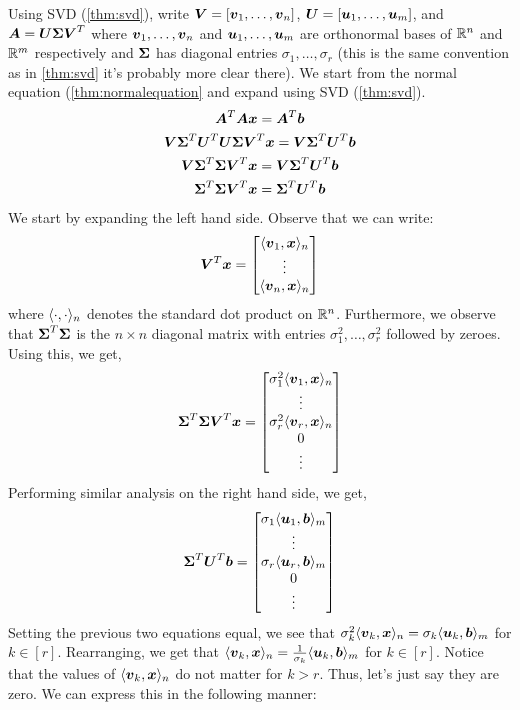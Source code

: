 Using SVD (\ref{thm:svd}), write $\boldsymbol{V}=[\boldsymbol{v}_1,\dots,\boldsymbol{v}_n]$, $\boldsymbol{U}=[\boldsymbol{u}_1,\dots, \boldsymbol{u}_m]$, and $\boldsymbol{A}=\boldsymbol{U}\boldsymbol{\Sigma}\boldsymbol{V}^T$ where $\boldsymbol{v}_1,\dots,\boldsymbol{v}_n$ and $\boldsymbol{u}_1,\dots,\boldsymbol{u}_m$ are orthonormal bases of $\mathbb{R}^n$ and $\mathbb{R}^m$ respectively and $\boldsymbol{\Sigma}$ has diagonal entries $\sigma_1,\dots,\sigma_r$ (this is the same convention as in \ref{thm:svd} it's probably more clear there). We start from the normal equation (\ref{thm:normalequation} and expand using SVD (\ref{thm:svd}).
\begin{gather*}
    \boldsymbol{A}^T\boldsymbol{A}\boldsymbol{x}=\boldsymbol{A}^T\boldsymbol{b}\\
    \boldsymbol{V}\boldsymbol{\Sigma}^T\boldsymbol{U}^T\boldsymbol{U}\boldsymbol{\Sigma}\boldsymbol{V}^T\boldsymbol{x}=\boldsymbol{V}\boldsymbol{\Sigma}^T\boldsymbol{U}^T\boldsymbol{b}\\
    \boldsymbol{V}\boldsymbol{\Sigma}^T\boldsymbol{\Sigma}\boldsymbol{V}^T\boldsymbol{x}=\boldsymbol{V}\boldsymbol{\Sigma}^T\boldsymbol{U}^T\boldsymbol{b}\\
    \boldsymbol{\Sigma}^T\boldsymbol{\Sigma}\boldsymbol{V}^T\boldsymbol{x}=\boldsymbol{\Sigma}^T\boldsymbol{U}^T\boldsymbol{b}
\end{gather*}
We start by expanding the left hand side. Observe that we can write:
\[
\boldsymbol{V}^T\boldsymbol{x}=\begin{bmatrix}
    \langle\boldsymbol{v}_1,\boldsymbol{x}\rangle_n\\
    \vdots\\
    \langle\boldsymbol{v}_n,\boldsymbol{x}\rangle_n
\end{bmatrix}
\]
where $\langle\cdot,\cdot\rangle_n$ denotes the standard dot product on $\mathbb{R}^n$. Furthermore, we observe that $\boldsymbol{\Sigma}^T\boldsymbol{\Sigma}$ is the $n\times n$ diagonal matrix with entries $\sigma_1^2,\dots,\sigma_r^2$ followed by zeroes. Using this, we get,
\[
\boldsymbol{\Sigma}^T\boldsymbol{\Sigma}\boldsymbol{V}^T\boldsymbol{x}=\begin{bmatrix}
    \sigma_1^2\langle\boldsymbol{v}_1,\boldsymbol{x}\rangle_n\\
    \vdots\\
    \sigma_r^2\langle\boldsymbol{v}_r,\boldsymbol{x}\rangle_n\\
    0 \\
    \vdots
\end{bmatrix}
\]
Performing similar analysis on the right hand side, we get,
\[
\boldsymbol{\Sigma}^T\boldsymbol{U}^T\boldsymbol{b}=\begin{bmatrix}
    \sigma_1\langle\boldsymbol{u}_1,\boldsymbol{b}\rangle_m\\
    \vdots\\
    \sigma_r\langle\boldsymbol{u}_r,\boldsymbol{b}\rangle_m\\
    0\\
    \vdots
\end{bmatrix}
\]
Setting the previous two equations equal, we see that $\sigma_k^2\langle\boldsymbol{v}_k,\boldsymbol{x}\rangle_n=\sigma_k\langle\boldsymbol{u}_k,\boldsymbol{b}\rangle_m$ for $k\in[r]$. Rearranging, we get that $\langle\boldsymbol{v}_k,\boldsymbol{x}\rangle_n=\frac{1}{\sigma_k}\langle\boldsymbol{u}_k,\boldsymbol{b}\rangle_m$ for $k\in[r]$. Notice that the values of $\langle\boldsymbol{v}_k,\boldsymbol{x}\rangle_n$ do not matter for $k>r$. Thus, let's just say they are zero. We can express this in the following manner:
